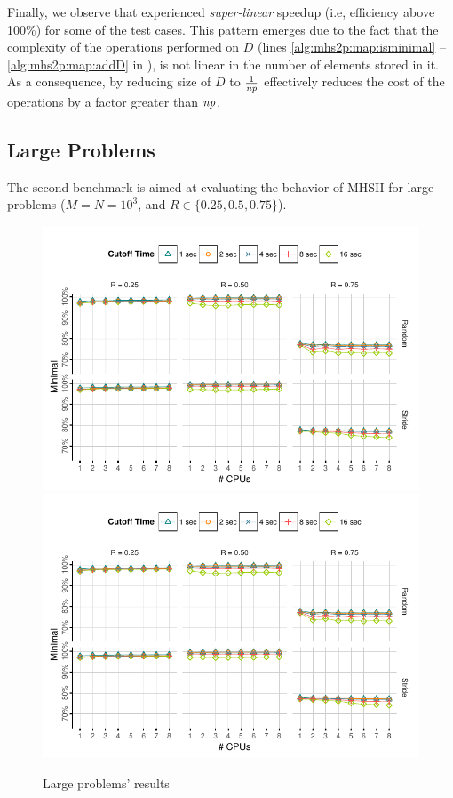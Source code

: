 Finally, we observe that \randomFn{} experienced \emph{super-linear}
speedup (i.e, efficiency above 100\%) for some of the test
cases.
%
This pattern emerges due to the fact that the complexity of the
operations performed on $D$ (lines \ref{alg:mhs2p:map:isminimal} --
\ref{alg:mhs2p:map:addD} in ), is not linear in
the number of elements stored in it.
%
As a consequence, by reducing size of $D$ to $\frac{1}{\mathit{np}}$ %
effectively reduces the cost of the operations by a factor greater than
$\mathit{np}$.
\FloatBarrier
\subsection{Large Problems}
\label{sec:mhs2p:results:large}

The second benchmark is aimed at evaluating the behavior of \ac{MHSII}
for large problems ($M = N = 10^3$, and $R \in \{0.25,0.5,0.75\}$).

\begin{figure}[!ht]
  \includegraphics[trim=0.5em 2.65em 0em 0em, clip, page=1]{figures/mhs2/figures/parallel_large.pdf}
  \\[0.5em]
  \includegraphics[trim=0.5em 0em 0em 5.5em, clip, page=6]{figures/mhs2/figures/parallel_large.pdf}
  \caption{Large problems' results\label{fig:mhs2p:results:large}}
\end{figure}


